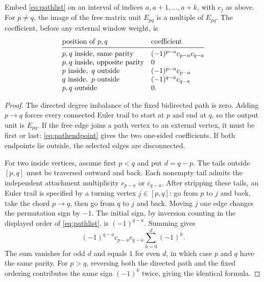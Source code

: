 \begin{lemma}\label{lem:pathchord}
Embed \eqref{eq:pathlist} on an interval of indices
$a,a+1,\ldots,a+k$, with $c_j$ as above. For $p\ne q$, the
image of the free matrix unit $E_{pq}$ is a multiple of $E_{pq}$.
The coefficient, before any external window weight, is
\begin{equation}\label{eq:pathchordtable}
\begin{array}{@{}ll@{}}
\text{position of $p,q$}&\text{coefficient}\\\midrule
p,q\text{ inside, same parity}&(-1)^{p-a}c_{p-a}c_{q-a}\\
p,q\text{ inside, opposite parity}&0\\
p\text{ inside},\ q\text{ outside}&(-1)^{p-a}c_{p-a}\\
q\text{ inside},\ p\text{ outside}&(-1)^{q-a}c_{q-a}\\
p,q\text{ outside}&0.
\end{array}
\end{equation}
\end{lemma}
\begin{proof}
The directed degree imbalance of the fixed bidirected path is zero.
Adding $p\to q$ forces every connected Euler trail to start at $p$
and end at $q$, so the output unit is $E_{pq}$. If the free edge
joins a path vertex to an external vertex, it must be first or
last; \eqref{eq:pathendpoint} gives the two one-sided coefficients.
If both endpoints lie outside, the selected edges are disconnected.

For two inside vertices, assume first $p<q$ and put $d=q-p$.
The tails outside $[p,q]$ must be traversed outward and back. Each
nonempty tail admits the independent attachment multiplicity
$c_{p-a}$ or $c_{q-a}$. After stripping these tails, an Euler trail
is specified by a turning vertex $j\in[p,q]$: go from $p$ to $j$
and back, take the chord $p\to q$, then go from $q$ to $j$ and
back. Moving $j$ one edge changes the permutation sign by $-1$.
The initial sign, by inversion counting in the displayed order of
\eqref{eq:pathlist}, is $(-1)^{q-a}$. Summing gives
\[
 (-1)^{q-a}c_{p-a}c_{q-a}
 \sum_{h=0}^{d}(-1)^h.
\]
The sum vanishes for odd $d$ and equals $1$ for even $d$, in
which case $p$ and $q$ have the same parity. For $p>q$, reversing
both the directed path and the fixed ordering contributes the
same sign $(-1)^k$ twice, giving the identical formula.
\end{proof}

